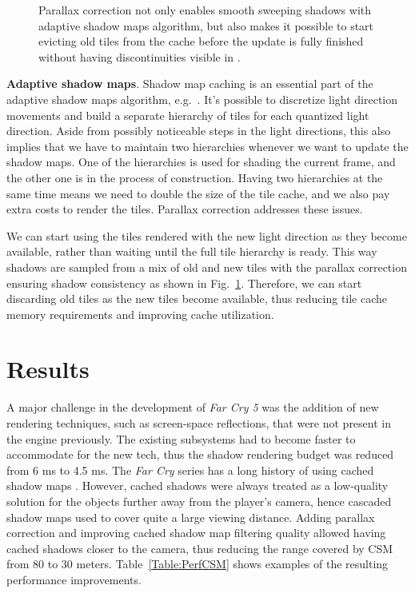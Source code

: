 \begin{figure}[t]
\hfill
{}
\caption{\small Parallax correction not only enables smooth sweeping shadows 
with adaptive shadow maps algorithm, but also makes it possible to start 
evicting old tiles from the cache before the update is fully finished without 
having discontinuities visible in \protect{}.}
\label{Fig:ASM}
\end{figure}

\bigskip
\textbf{Adaptive shadow maps}. Shadow map caching is an essential part of 
the adaptive shadow maps algorithm, e.g.~\cite{ASM11}. It's possible to discretize 
light direction movements and build a separate hierarchy of tiles for each 
quantized light direction. Aside from possibly noticeable steps in the light 
directions, this also implies that we have to maintain two hierarchies whenever 
we want to update the shadow maps. One of the hierarchies is used for 
shading the current frame, and the other one is in the process of 
construction. Having two hierarchies at the same time means we need to 
double the size of the tile cache, and we also pay extra costs to render 
the tiles. Parallax correction addresses these issues.

We can start using the tiles rendered with the new light direction 
as they become available, rather than waiting until the full tile hierarchy
is ready. This way shadows are sampled from a mix of old and new tiles 
with the parallax correction ensuring shadow consistency as shown in 
Fig.~\ref{Fig:ASM}. Therefore, we can start discarding old tiles as the new tiles 
become available, thus reducing tile cache memory requirements and 
improving cache utilization.

\section{Results}

A major challenge in the development of \textit{Far Cry 5} was the addition
of new rendering techniques, such as screen-space reflections, that were not present 
in the engine previously. The existing subsystems 
had to become faster to accommodate for the new tech, thus the shadow rendering budget was 
reduced from 6 ms to 4.5 ms. The \textit{Far Cry} series has a long history of using cached shadow maps
\cite{ShadowsInGames}. However, cached shadows were always treated as a low-quality
solution for the objects further away from the player's camera, hence cascaded shadow maps
used to cover quite a large viewing distance. Adding parallax correction and 
improving cached shadow map filtering quality allowed having cached
shadows closer to the camera, thus reducing the range covered by CSM from 80 to 
30 meters. Table~\ref{Table:PerfCSM} shows examples of the resulting performance improvements.

